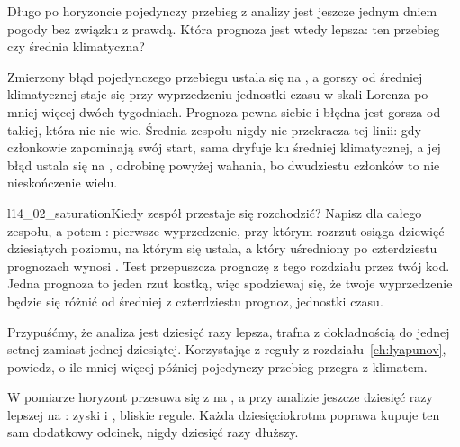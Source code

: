 \begin{think}
Długo po horyzoncie pojedynczy przebieg z analizy jest jeszcze jednym dniem
pogody bez związku z prawdą. Która prognoza jest wtedy lepsza: ten przebieg
czy średnia klimatyczna?
\end{think}


\noindent
Zmierzony błąd pojedynczego przebiegu ustala się na , a
gorszy od średniej klimatycznej staje się przy wyprzedzeniu
 jednostki czasu \dash{} w skali Lorenza po mniej więcej
dwóch tygodniach. Prognoza pewna siebie i błędna jest gorsza od takiej,
która nic nie wie. Średnia zespołu nigdy nie przekracza tej linii: gdy
członkowie zapominają swój start, sama dryfuje ku średniej klimatycznej, a
jej błąd ustala się na , odrobinę powyżej wahania, bo
dwudziestu członków to nie nieskończenie wielu.

\begin{lab}{l14_02_saturation}{Kiedy zespół przestaje się rozchodzić?}
Napisz  dla całego zespołu, a potem :
pierwsze wyprzedzenie, przy którym rozrzut osiąga dziewięć dziesiątych
poziomu, na którym się ustala, a który uśredniony po czterdziestu prognozach
wynosi . Test przepuszcza prognozę z tego rozdziału
przez twój kod. Jedna prognoza to jeden rzut kostką, więc spodziewaj się, że
twoje wyprzedzenie będzie się różnić od średniej z czterdziestu prognoz,
 jednostki czasu.
\end{lab}

\begin{think}
Przypuśćmy, że analiza jest dziesięć razy lepsza, trafna z dokładnością do
jednej setnej zamiast jednej dziesiątej. Korzystając z reguły z
rozdziału~\ref{ch:lyapunov}, powiedz, o ile mniej więcej później pojedynczy
przebieg przegra z klimatem.
\end{think}
W pomiarze horyzont przesuwa się z  na ,
a przy analizie jeszcze dziesięć razy lepszej na : zyski
 i , bliskie regule. Każda
dziesięciokrotna poprawa kupuje ten sam dodatkowy odcinek, nigdy dziesięć
razy dłuższy.

